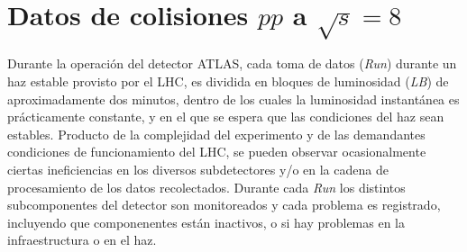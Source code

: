 


\section{Datos de colisiones $pp$ a $\sqrt{s} = 8$ \tev}

Durante la operación del detector ATLAS, cada toma de datos (\emph{Run}) durante
un haz estable provisto por el LHC, es dividida en bloques de luminosidad
(\emph{LB}) de aproximadamente dos minutos, dentro de los cuales la luminosidad
instantánea es prácticamente constante, y en el que se espera que las
condiciones del haz sean estables. Producto de la complejidad del experimento y
de las demandantes condiciones de funcionamiento del LHC, se pueden observar
ocasionalmente ciertas ineficiencias en los diversos subdetectores y/o en la
cadena de procesamiento de los datos recolectados. Durante cada \emph{Run} los
distintos subcomponentes del detector son monitoreados y cada problema es
registrado, incluyendo que componenentes están inactivos, o si hay problemas en
la infraestructura o en el haz.

